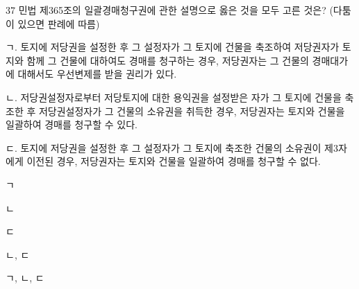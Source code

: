 \begin{question}{37}
민법 제365조의 일괄경매청구권에 관한 설명으로 옳은 것을 모두 고른 것은? (다툼이 있으면 판례에 따름)
\begin{framedtext}
ㄱ. 토지에 저당권을 설정한 후 그 설정자가 그 토지에 건물을 축조하여 저당권자가 토지와 함께 그 건물에 대하여도 경매를 청구하는 경우, 저당권자는 그 건물의 경매대가에 대해서도 우선변제를 받을 권리가 있다. \par
ㄴ. 저당권설정자로부터 저당토지에 대한 용익권을 설정받은 자가 그 토지에 건물을 축조한 후 저당권설정자가 그 건물의 소유권을 취득한 경우, 저당권자는 토지와 건물을 일괄하여 경매를 청구할 수 있다. \par
ㄷ. 토지에 저당권을 설정한 후 그 설정자가 그 토지에 축조한 건물의 소유권이 제3자에게 이전된 경우, 저당권자는 토지와 건물을 일괄하여 경매를 청구할 수 없다.
\end{framedtext}
\begin{choices}
  \item ㄱ
  \item ㄴ
  \item ㄷ
  \item ㄴ, ㄷ
  \item ㄱ, ㄴ, ㄷ
\end{choices}
\end{question}
